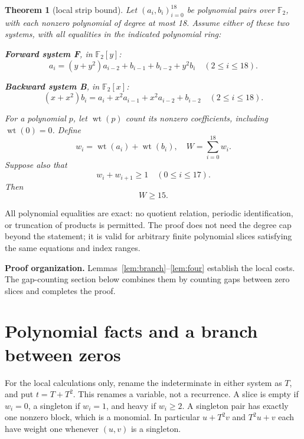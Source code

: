 \documentclass{article}
\newtheorem{theorem}{Theorem}
\DeclareMathOperator{\wt}{wt}
\newcommand{\Ftwo}{\mathbb{F}_2}
\begin{document}
\begin{theorem}[local strip bound]\label{thm:strip}
  Let \((a_i,b_i)_{i=0}^{18}\) be polynomial pairs over \(\Ftwo\), with
  each nonzero polynomial of degree at most 18. Assume either of these two
  systems, with all equalities in the indicated polynomial ring:

  \textbf{Forward system F}, in \(\Ftwo[y]\):
  \begin{equation}\label{eq:forward}
    a_i=(y+y^2)a_{i-2}+b_{i-1}+b_{i-2}+y^2b_i
    \quad (2\le i\le 18).
  \end{equation}

  \textbf{Backward system B}, in \(\Ftwo[x]\):
  \begin{equation}\label{eq:backward}
    (x+x^2)b_i=a_i+x^2a_{i-1}+x^2a_{i-2}+b_{i-2}
    \quad (2\le i\le 18).
  \end{equation}

  For a polynomial \(p\), let \(\wt(p)\) count its nonzero coefficients,
  including \(\wt(0)=0\). Define
  \begin{equation}
    w_i=\wt(a_i)+\wt(b_i), \quad W=\sum_{i=0}^{18}w_i.
  \end{equation}
  Suppose also that
  \begin{equation}\label{eq:adjacent}
    w_i+w_{i+1}\ge 1 \quad (0\le i\le 17).
  \end{equation}
  Then
  \begin{equation}\label{eq:main-bound}
    W\ge 15.
  \end{equation}
\end{theorem}

All polynomial equalities are exact: no quotient relation, periodic
identification, or truncation of products is permitted. The proof does not
need the degree cap beyond the statement; it is valid for arbitrary finite
polynomial slices satisfying the same equations and index ranges.

\textbf{Proof organization.} Lemmas~\ref{lem:branch}--\ref{lem:four} establish
the local costs. The gap-counting section below
combines them by counting gaps between zero slices and completes the proof.

\section{Polynomial facts and a branch between zeros}\label{sec:branch}

For the local calculations only, rename the indeterminate in either
system as \(T\), and put \(t=T+T^2\). This renames a variable, not a recurrence.
A slice is empty if \(w_i=0\), a singleton if \(w_i=1\), and heavy if
\(w_i\ge 2\). A singleton pair has exactly one nonzero block, which is a
monomial. In particular \(u+T^2v\) and \(T^2u+v\) each have weight one whenever
\((u,v)\) is a singleton.
\end{document}
